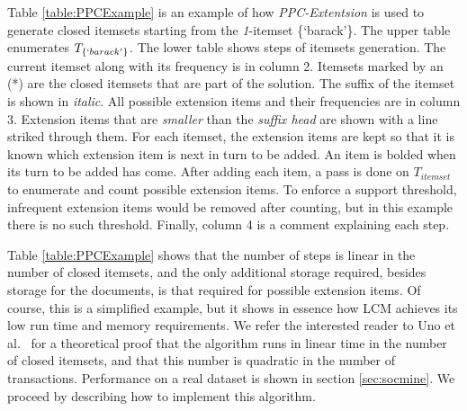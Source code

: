 \documentclass{sig-alternate}
\begin{document}
Table \ref{table:PPCExample} is an example of how \emph{PPC-Extentsion} is
used to generate closed itemsets starting from the
\emph{1}-itemset \{`barack'\}.
The upper table enumerates $T_{\{`barack'\}}$.
The lower table shows steps of itemsets generation.
The current itemset along with its frequency is in column 2.
Itemsets marked by an (*) are the closed itemsets that are part of the solution.
The suffix of the itemset is shown in \emph{italic}. 
All possible extension items and their frequencies are in column 3. 
Extension items that are \emph{smaller} than the \emph{suffix head} 
are shown with a line striked through them. 
For each itemset, the extension items are kept 
so that it is known which extension item 
is next in turn to be added.
An item is bolded when its turn to be added has come.
After adding each item, a pass is done on $T_{itemset}$ to 
enumerate and count possible extension items.
To enforce a support threshold, infrequent extension items would be removed
after counting, %
but in this example there is no such threshold.
Finally, column 4 is a comment explaining each step.

Table \ref{table:PPCExample} shows that the number of steps is linear in the number of closed itemsets,
and the only additional storage required, besides storage for the documents,
is that required for possible extension items.
Of course, this is a simplified example, but it shows in essence how LCM
achieves its low run time and memory requirements.
We refer the interested reader to Uno et al.~\cite{uno2004lcm} for a
theoretical proof that the algorithm runs in linear time in the number of
closed itemsets,
and that this number is quadratic in the number of transactions.
Performance on a real dataset is shown in section \ref{sec:socmine}.
We proceed by describing how to implement this algorithm. 


\end{document}
